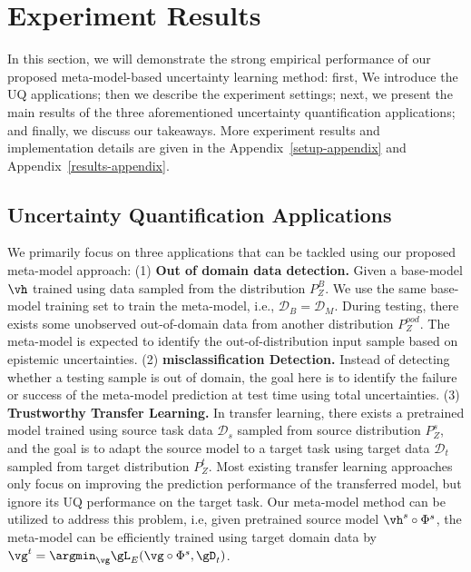 \section{Experiment Results} \label{sec:exp}
In this section, we will demonstrate the strong empirical performance of our proposed meta-model-based uncertainty learning method: first, We introduce the UQ applications; then we describe the experiment settings; next, we present the main results of the three aforementioned uncertainty quantification applications; and finally, we discuss our takeaways. More experiment results and implementation details are given in the Appendix~\ref{setup-appendix} and Appendix~\ref{results-appendix}.


\subsection{Uncertainty Quantification Applications} \label{sec:app}
We primarily focus on three applications that can be tackled using our proposed meta-model approach: (1) \textbf{Out of domain data detection.}
Given a base-model $\vh$ trained using data sampled from the distribution $P^B_{Z}$. We use the same base-model training set to train the meta-model, i.e., $\mathcal{D}_{B} = \mathcal{D}_{M}$. During testing, there exists some unobserved out-of-domain data from another distribution $P^{ood}_{Z}$. The meta-model is expected to identify the out-of-distribution input sample based on epistemic uncertainties.  (2) \textbf{misclassification Detection.}
Instead of detecting whether a testing sample is out of domain, the goal here is to identify the failure or success of the meta-model prediction at test time using total uncertainties. (3) \textbf{Trustworthy Transfer Learning.}
In transfer learning, there exists a pretrained model trained using source task data $\mathcal{D}_{s}$ sampled from source distribution $P^s_{Z}$, and the goal is to adapt the source model to a target task using target data $\mathcal{D}_{t}$ sampled from target distribution $P^t_{Z}$. Most existing transfer learning approaches only focus on improving the prediction performance of the transferred model, but ignore its UQ performance on the target task. Our meta-model method can be utilized to address this problem, i.e, given pretrained source model $\vh^{s} \circ \Phi^{s}$, the meta-model can be efficiently trained using target domain data by $\vg^t = \argmin_{\vg} \gL_E(\vg \circ \Phi^s,\gD_t)$.


